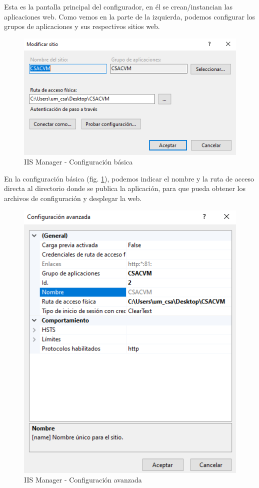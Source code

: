 Esta es la pantalla principal del configurador, en él se crean/instancian las aplicaciones web.
Como vemos en la parte de la izquierda, podemos configurar los grupos de aplicaciones y sus respectivos sitios web. 

\begin{figure}
    \centering
    \includegraphics[width=\linewidth]{img/ManualProgramador/Despliegue02.png}
    \caption{IIS Manager - Configuración básica}
    \label{iisBasica}
\end{figure}

En la configuración básica (fig. \ref{iisBasica}), podemos indicar el nombre y la ruta de acceso directa al directorio donde se publica la aplicación, para que pueda obtener los archivos de configuración y desplegar la web.

\begin{figure}
    \centering
    \includegraphics[width=\linewidth]{img/ManualProgramador/Despliegue03.png}
    \caption{IIS Manager - Configuración avanzada}
    \label{iisAvanzada}
\end{figure}

